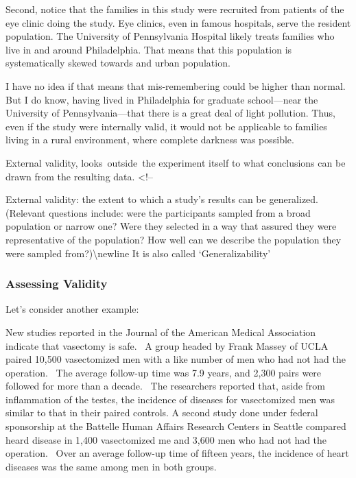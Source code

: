 \begin{refsection}
Second, notice that the families in this study were recruited from patients of the eye clinic doing the study. Eye clinics, even in famous hospitals, serve the resident population. The University of Pennsylvania Hospital likely treats families who live in and around Philadelphia. That means that this population is systematically skewed towards and urban population.

I have no idea if that means that mis-remembering could be higher than normal. But I do know, having lived in Philadelphia for graduate school---near the University of Pennsylvania---that there is a great deal of light pollution. Thus, even if the study were internally valid, it would not be applicable to families living in a rural environment, where complete darkness was possible.

 External validity, looks outside the experiment itself to what conclusions can be drawn from the resulting data.
<!--\begin{thesis}

External validity: the extent to which a study's results can be generalized. (Relevant questions include: were the participants sampled from a broad population or narrow one? Were they selected in a way that assured they were representative of the population? How well can we describe the population they were sampled from?)\textbackslash{}newline
It is also called `Generalizability'
\end{thesis}

\subsubsection{Assessing Validity}
\label{assessingvalidity}

Let's consider another example:

\begin{apatextbox}
New studies reported in the Journal of the American Medical Association indicate that vasectomy is safe.  A group headed by Frank Massey of UCLA paired 10,500 vasectomized men with a like number of men who had not had the operation.  The average follow-up time was 7.9 years, and 2,300 pairs were followed for more than a decade.  The researchers reported that, aside from inflammation of the testes, the incidence of diseases for vasectomized men was similar to that in their paired controls.\newline
A second study done under federal sponsorship at the Battelle Human Affairs Research Centers in Seattle compared heard disease in 1,400 vasectomized me and 3,600 men who had not had the operation.  Over an average follow-up time of fifteen years, the incidence of heart diseases was the same among men in both groups. \end{apatextbox}


\end{refsection}
